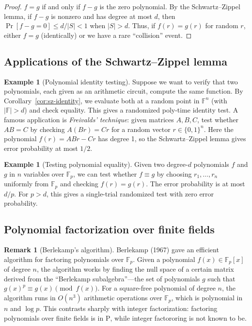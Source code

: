 \documentclass[twoside,12pt]{book}
\theoremstyle{plain}
\theoremstyle{definition}
\newtheorem{example}[theorem]{Example}
\newtheorem{remark}[theorem]{Remark}
\theoremstyle{remark}
\begin{document}
\begin{proof}
$f = g$ if and only if $f - g$ is the zero polynomial. By the Schwartz--Zippel lemma, if $f - g$ is nonzero and has degree at most $d$, then $\Pr[f - g = 0] \leq d/|S| < 1$ when $|S| > d$. Thus, if $f(r) = g(r)$ for random $r$, either $f = g$ (identically) or we have a rare ``collision'' event.
\end{proof}

\subsection{Applications of the Schwartz--Zippel lemma}

\begin{example}[Polynomial identity testing]
\label{ex:pit}
Suppose we want to verify that two polynomials, each given as an arithmetic circuit, compute the same function. By Corollary~\ref{cor:sz-identity}, we evaluate both at a random point in $\mathbb{F}^n$ (with $|\mathbb{F}| > d$) and check equality. This gives a randomized poly-time identity test. A famous application is \emph{Freivalds' technique}: given matrices $A, B, C$, test whether $AB = C$ by checking $A(Br) = Cr$ for a random vector $r \in \{0,1\}^n$. Here the polynomial $f(r) = AB r - Cr$ has degree 1, so the Schwartz--Zippel lemma gives error probability at most $1/2$.
\end{example}

\begin{example}[Testing polynomial equality]
Given two degree-$d$ polynomials $f$ and $g$ in $n$ variables over $\mathbb{F}_p$, we can test whether $f \equiv g$ by choosing $r_1, \ldots, r_n$ uniformly from $\mathbb{F}_p$ and checking $f(r) = g(r)$. The error probability is at most $d/p$. For $p > d$, this gives a single-trial randomized test with zero error probability.
\end{example}

\subsection{Polynomial factorization over finite fields}

\begin{remark}[Berlekamp's algorithm]
Berlekamp (1967) gave an efficient algorithm for factoring polynomials over $\mathbb{F}_p$. Given a polynomial $f(x) \in \mathbb{F}_p[x]$ of degree $n$, the algorithm works by finding the null space of a certain matrix derived from the ``Berlekamp subalgebra''---the set of polynomials $g$ such that $g(x)^p \equiv g(x) \pmod{f(x)}$. For a square-free polynomial of degree $n$, the algorithm runs in $O(n^3)$ arithmetic operations over $\mathbb{F}_p$, which is polynomial in $n$ and $\log p$. This contrasts sharply with integer factorization: factoring polynomials over finite fields is in $\text{P}$, while integer factororing is not known to be.
\end{remark}
\end{document}
